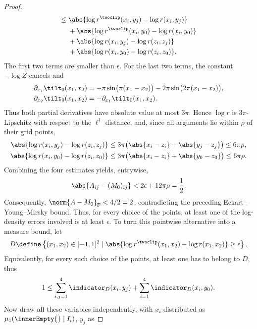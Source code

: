 \documentclass{article}
\begin{document}
\begin{proof}
\begin{align*}
  \leq{} &
  \abs{\log r^{\twoclip}(x_i,y_j)-\log r(x_i,y_j)}           \\
         & +\abs{\log r^{\twoclip}(x_i,y_0)-\log r(x_i,y_0)} \\
         & +\abs{\log r(x_i,y_j)-\log r(z_i,z_j)}            \\
         & +\abs{\log r(x_i,y_0)-\log r(z_i,z_0)}.
 \end{align*}
 The first two terms are smaller than $\epsilon$. For the last two terms,
 the constant $-\log Z$ cancels and
 \begin{align*}
  \partial_{x_1}\tilt_0(x_1,x_2)
   & =-\pi\sin\bigl(\pi(x_1-x_2)\bigr)
  -2\pi\sin\bigl(2\pi(x_1-x_2)\bigr),  \\
  \partial_{x_2}\tilt_0(x_1,x_2)
   & =-\partial_{x_1}\tilt_0(x_1,x_2).
 \end{align*}
 Thus both partial derivatives have absolute value at most $3\pi$.
 Hence $\log r$ is $3\pi$-Lipschitz with respect to the $\ell^1$ distance,
 and, since all arguments lie within $\rho$ of their grid points,
 \begin{align*}
  \abs{\log r(x_i,y_j)-\log r(z_i,z_j)}
   & \leq3\pi\bigl(\abs{x_i-z_i}+\abs{y_j-z_j}\bigr)
  \leq6\pi\rho,                                      \\
  \abs{\log r(x_i,y_0)-\log r(z_i,z_0)}
   & \leq3\pi\bigl(\abs{x_i-z_i}+\abs{y_0-z_0}\bigr)
  \leq6\pi\rho.
 \end{align*}
 Combining the four estimates yields, entrywise,
 \begin{align*}
  \abs{A_{ij}-(M_0)_{ij}}
  <2\epsilon+12\pi\rho
  =\frac12.
 \end{align*}
 Consequently, $\norm{A-M_0}_{\mathrm{F}}<4/2 =2$, contradicting the
 preceding Eckart--Young--Mirsky bound. Thus, for every choice of the points, at
 least one of the log-density errors involved is at least $\epsilon$. To
 turn this pointwise alternative into a measure bound, let
 \begin{align*}
  D\define\left\{(x_1,x_2) \in [-1,1]^2 \; \vert \;
  \abs{\log r^{\twoclip}(x_1,x_2)-\log r(x_1,x_2)}
  \geq\epsilon\right\}.
 \end{align*}
 Equivalently, for every such choice of the points, at least one
 has to belong to $D$, thus
 \begin{align*}
  1
  \leq\sum_{i,j=1}^4\indicator_D(x_i,y_j)
  +\sum_{i=1}^4\indicator_D(x_i,y_0).
 \end{align*}
 Now draw all these variables independently, with $x_i$ distributed as
 $\mu_1(\innerEmpty{}\mid I_i)$, $y_j$ as

\end{proof}
\end{document}
